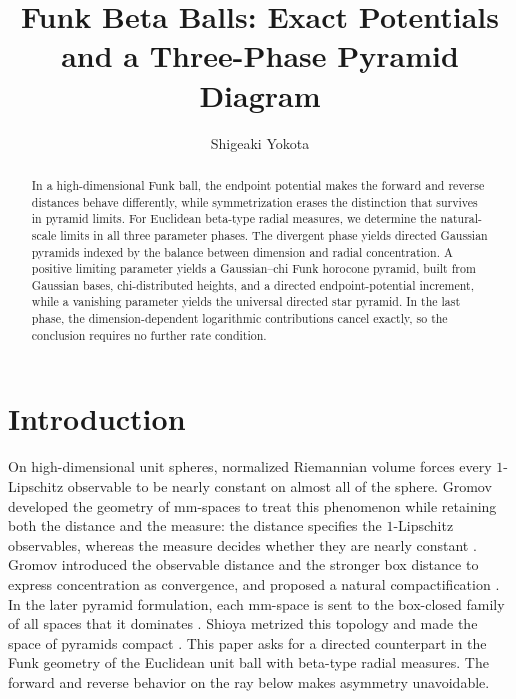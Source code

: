 \documentclass{amsart}
\title[Funk Beta Balls]{Funk Beta Balls: Exact Potentials and a Three-Phase Pyramid Diagram}
\author{Shigeaki Yokota}
\date{}
\numberwithin{equation}{section}
\theoremstyle{plain}
\theoremstyle{definition}
\theoremstyle{remark}
\begin{document}
\begin{abstract}
In a high-dimensional Funk ball, the endpoint potential makes the forward and reverse distances behave differently, while symmetrization erases the distinction that survives in pyramid limits. For Euclidean beta-type radial measures, we determine the natural-scale limits in all three parameter phases. The divergent phase yields directed Gaussian pyramids indexed by the balance between dimension and radial concentration. A positive limiting parameter yields a Gaussian--chi Funk horocone pyramid, built from Gaussian bases, chi-distributed heights, and a directed endpoint-potential increment, while a vanishing parameter yields the universal directed star pyramid. In the last phase, the dimension-dependent logarithmic contributions cancel exactly, so the conclusion requires no further rate condition.
\end{abstract}

\maketitle
\tableofcontents

\section{Introduction}\label{sec:introduction}

On high-dimensional unit spheres, normalized Riemannian volume forces every $1$-Lipschitz observable to be nearly constant on almost all of the sphere.  Gromov developed the geometry of mm-spaces to treat this phenomenon while retaining both the distance and the measure: the distance specifies the $1$-Lipschitz observables, whereas the measure decides whether they are nearly constant \cite[Introduction]{shioya2016mmg}.  Gromov introduced the observable distance and the stronger box distance to express concentration as convergence, and proposed a natural compactification \cite[Introduction and Section~2.2]{esaki-kazukawa-mitsuishi2024cones}.  In the later pyramid formulation, each mm-space is sent to the box-closed family of all spaces that it dominates \cite[Definition~2.24]{esaki-kazukawa-mitsuishi2024cones}.  Shioya metrized this topology and made the space of pyramids compact \cite[Definition~4.5 and Theorem~4.6]{shioya2022sugaku}.  This paper asks for a directed counterpart in the Funk geometry of the Euclidean unit ball with beta-type radial measures.  The forward and reverse behavior on the ray below makes asymmetry unavoidable.
\end{document}
